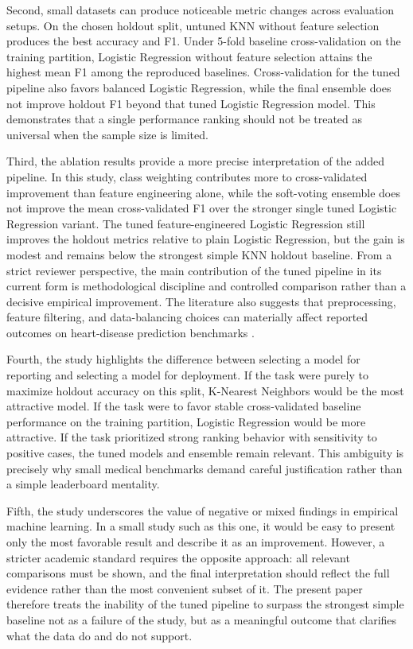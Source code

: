 \documentclass[conference]{IEEEtran}
\begin{document}
Second, small datasets can produce noticeable metric changes across evaluation setups. On the chosen holdout split, untuned KNN without feature selection produces the best accuracy and F1. Under 5-fold baseline cross-validation on the training partition, Logistic Regression without feature selection attains the highest mean F1 among the reproduced baselines. Cross-validation for the tuned pipeline also favors balanced Logistic Regression, while the final ensemble does not improve holdout F1 beyond that tuned Logistic Regression model. This demonstrates that a single performance ranking should not be treated as universal when the sample size is limited.

Third, the ablation results provide a more precise interpretation of the added pipeline. In this study, class weighting contributes more to cross-validated improvement than feature engineering alone, while the soft-voting ensemble does not improve the mean cross-validated F1 over the stronger single tuned Logistic Regression variant. The tuned feature-engineered Logistic Regression still improves the holdout metrics relative to plain Logistic Regression, but the gain is modest and remains below the strongest simple KNN holdout baseline. From a strict reviewer perspective, the main contribution of the tuned pipeline in its current form is methodological discipline and controlled comparison rather than a decisive empirical improvement. The literature also suggests that preprocessing, feature filtering, and data-balancing choices can materially affect reported outcomes on heart-disease prediction benchmarks \cite{spencer2020feature,albert2023oversampling,rehman2025mi}.

Fourth, the study highlights the difference between selecting a model for reporting and selecting a model for deployment. If the task were purely to maximize holdout accuracy on this split, K-Nearest Neighbors would be the most attractive model. If the task were to favor stable cross-validated baseline performance on the training partition, Logistic Regression would be more attractive. If the task prioritized strong ranking behavior with sensitivity to positive cases, the tuned models and ensemble remain relevant. This ambiguity is precisely why small medical benchmarks demand careful justification rather than a simple leaderboard mentality.

Fifth, the study underscores the value of negative or mixed findings in empirical machine learning. In a small study such as this one, it would be easy to present only the most favorable result and describe it as an improvement. However, a stricter academic standard requires the opposite approach: all relevant comparisons must be shown, and the final interpretation should reflect the full evidence rather than the most convenient subset of it. The present paper therefore treats the inability of the tuned pipeline to surpass the strongest simple baseline not as a failure of the study, but as a meaningful outcome that clarifies what the data do and do not support.
\end{document}
